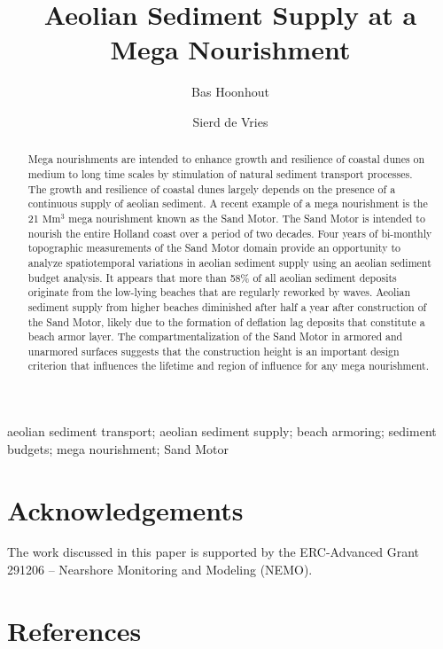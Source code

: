 \documentclass[preprint,12pt,authoryear]{elsarticle}
\begin{document}
\begin{frontmatter}

  \title{Aeolian Sediment Supply at a Mega Nourishment}

  \author[tudelft,deltares]{Bas Hoonhout}

  \author[tudelft]{Sierd de Vries}

  \address[tudelft]{Delft University of Technology, Faculty of Civil
    Engineering and Geosciences, Department of Hydraulic Engineering,
    Stevinweg 1, 2628CN Delft, The Netherlands.}

  \address[deltares]{Deltares, Department of Hydraulic Engineering,
    Boussinesqweg 1, 2629HV Delft, The Netherlands.}

  \begin{abstract}
    Mega nourishments are intended to enhance growth and resilience of
    coastal dunes on medium to long time scales by stimulation of
    natural sediment transport processes. The growth and resilience of
    coastal dunes largely depends on the presence of a continuous
    supply of aeolian sediment. A recent example of a mega nourishment
    is the 21 $\mathrm{Mm^3}$ mega nourishment known as the Sand
    Motor. The Sand Motor is intended to nourish the entire Holland
    coast over a period of two decades. Four years of bi-monthly
    topographic measurements of the Sand Motor domain provide an
    opportunity to analyze spatiotemporal variations in aeolian
    sediment supply using an aeolian sediment budget analysis. It
    appears that more than 58\% of all aeolian sediment deposits
    originate from the low-lying beaches that are regularly reworked
    by waves. Aeolian sediment supply from higher beaches diminished
    after half a year after construction of the Sand Motor, likely due
    to the formation of deflation lag deposits that constitute a beach
    armor layer. The compartmentalization of the Sand Motor in armored
    and unarmored surfaces suggests that the construction height is an
    important design criterion that influences the lifetime and region
    of influence for any mega nourishment.
  \end{abstract}

  \begin{keyword}
    aeolian sediment transport; aeolian sediment supply; beach
    armoring; sediment budgets; mega nourishment; Sand Motor
  \end{keyword}

\end{frontmatter}



\section*{Acknowledgements}
The work discussed in this paper is supported by the ERC-Advanced
Grant 291206 -- Nearshore Monitoring and Modeling (NEMO).

\section*{References}
{}
\end{document}
